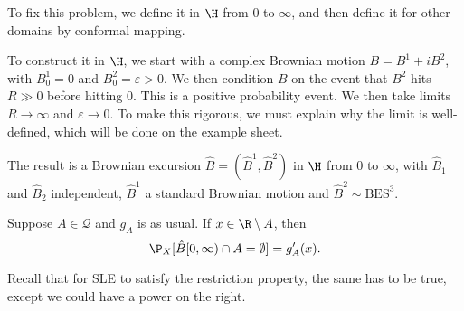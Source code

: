 \documentclass[a4paper]{article}
\newcommand\BES{\mathrm{BES}}
\begin{document}
To fix this problem, we define it in $\H$ from $0$ to $\infty$, and then define it for other domains by conformal mapping.

To construct it in $\H$, we start with a complex Brownian motion $B = B^1 + i B^2$, with $B^1_0 = 0$ and $B_0^2 = \varepsilon > 0$. We then condition $B$ on the event that $B^2$ hits $R \gg 0$ before hitting $0$. This is a positive probability event. We then take limits $R \to \infty$ and $\varepsilon \to 0$. To make this rigorous, we must explain why the limit is well-defined, which will be done on the example sheet.

The result is a Brownian excursion $\hat{B} = (\hat{B}^1, \hat{B}^2)$ in $\H$ from $0$ to $\infty$, with $\hat{B}_1$ and $\hat{B}_2$ independent, $\hat{B}^1$ a standard Brownian motion and $\hat{B}^2 \sim \BES^3$.

\begin{prop}
  Suppose $A \in \mathcal{Q}$ and $g_A$ is as usual. If $x \in \R \setminus A$, then
  \[
    \P_X[\hat{B}[0, \infty) \cap A = \emptyset] = g_A'(x).
  \]
\end{prop}
Recall that for SLE to satisfy the restriction property, the same has to be true, except we could have a power on the right.
\end{document}

